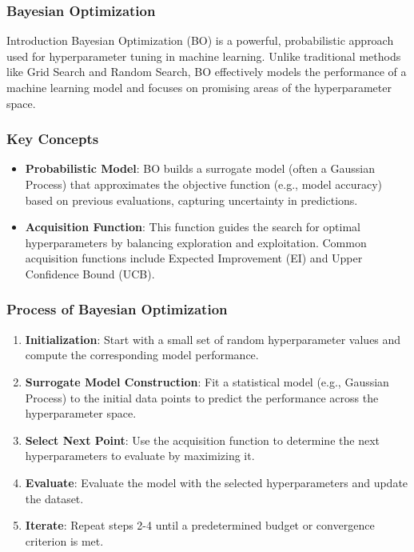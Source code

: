 \documentclass[aspectratio=169]{beamer}
\begin{document}
\begin{frame}[fragile]
    \frametitle{Bayesian Optimization}
    \begin{block}{Introduction}
        Bayesian Optimization (BO) is a powerful, probabilistic approach used for hyperparameter tuning in machine learning.
        Unlike traditional methods like Grid Search and Random Search, BO effectively models the performance of a machine learning model and focuses on promising areas of the hyperparameter space.
    \end{block}
\end{frame}

\begin{frame}[fragile]
    \frametitle{Key Concepts}
    \begin{itemize}
        \item \textbf{Probabilistic Model}: 
        BO builds a surrogate model (often a Gaussian Process) that approximates the objective function (e.g., model accuracy) based on previous evaluations, capturing uncertainty in predictions.
        
        \item \textbf{Acquisition Function}: 
        This function guides the search for optimal hyperparameters by balancing exploration and exploitation. Common acquisition functions include Expected Improvement (EI) and Upper Confidence Bound (UCB).
    \end{itemize}
\end{frame}

\begin{frame}[fragile]
    \frametitle{Process of Bayesian Optimization}
    \begin{enumerate}
        \item \textbf{Initialization}: 
        Start with a small set of random hyperparameter values and compute the corresponding model performance.
        
        \item \textbf{Surrogate Model Construction}: 
        Fit a statistical model (e.g., Gaussian Process) to the initial data points to predict the performance across the hyperparameter space.
        
        \item \textbf{Select Next Point}: 
        Use the acquisition function to determine the next hyperparameters to evaluate by maximizing it.
        
        \item \textbf{Evaluate}: 
        Evaluate the model with the selected hyperparameters and update the dataset.
        
        \item \textbf{Iterate}: 
        Repeat steps 2-4 until a predetermined budget or convergence criterion is met.
    \end{enumerate}
\end{frame}
\end{document}

